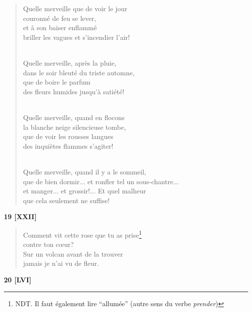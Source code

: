 \documentclass[a4paper,11pt]{book}
\begin{document}
\begin{verse}
Quelle merveille que de voir le jour \\
couronné de feu se lever, \\
et à son baiser enflammé \\
briller les vagues et s'incendier l'air! \\ \

Quelle merveille, après la pluie, \\
dans le soir bleuté du triste automne, \\
que de boire le parfum \\
des fleurs humides jusqu'à satiété! \\ \

Quelle merveille, quand en flocons \\
la blanche neige silencieuse tombe, \\
que de voir les rousses langues \\
des inquiètes flammes s'agiter! \\ \

Quelle merveille, quand il y a le sommeil, \\
que de bien dormir... et ronfler tel un sous-chantre... \\
et manger... et grossir!... Et quel malheur \\
que cela seulement ne suffise! \\
\end{verse}

\bigskip

\begin{center} {\bf 19 [XXII]} \end{center}

\begin{verse}
Comment vit cette rose que tu as prise\footnote{NDT. Il faut également lire ``allumée'' (autre sens du verbe {\em prender})} \\
contre ton c{\oe}ur? \\
Sur un volcan avant de la trouver \\
jamais je n'ai vu de fleur. \\
\end{verse}

\bigskip

\begin{center} {\bf 20 [LVI]} \end{center}
\end{document}
